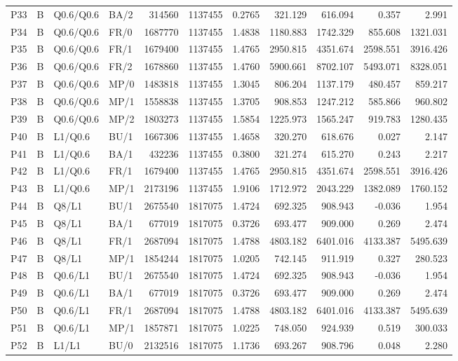 \begin{longtable}{llllrrrrrrr}
P33 & B & Q0.6/Q0.6 & BA/2 & 314560 & 1137455 & 0.2765 & 321.129 & 616.094 & 0.357 & 2.991\\
P34 & B & Q0.6/Q0.6 & FR/0 & 1687770 & 1137455 & 1.4838 & 1180.883 & 1742.329 & 855.608 & 1321.031\\
P35 & B & Q0.6/Q0.6 & FR/1 & 1679400 & 1137455 & 1.4765 & 2950.815 & 4351.674 & 2598.551 & 3916.426\\
P36 & B & Q0.6/Q0.6 & FR/2 & 1678860 & 1137455 & 1.4760 & 5900.661 & 8702.107 & 5493.071 & 8328.051\\
P37 & B & Q0.6/Q0.6 & MP/0 & 1483818 & 1137455 & 1.3045 & 806.204 & 1137.179 & 480.457 & 859.217\\
P38 & B & Q0.6/Q0.6 & MP/1 & 1558838 & 1137455 & 1.3705 & 908.853 & 1247.212 & 585.866 & 960.802\\
P39 & B & Q0.6/Q0.6 & MP/2 & 1803273 & 1137455 & 1.5854 & 1225.973 & 1565.247 & 919.783 & 1280.435\\
P40 & B & L1/Q0.6 & BU/1 & 1667306 & 1137455 & 1.4658 & 320.270 & 618.676 & 0.027 & 2.147\\
P41 & B & L1/Q0.6 & BA/1 & 432236 & 1137455 & 0.3800 & 321.274 & 615.270 & 0.243 & 2.217\\
P42 & B & L1/Q0.6 & FR/1 & 1679400 & 1137455 & 1.4765 & 2950.815 & 4351.674 & 2598.551 & 3916.426\\
P43 & B & L1/Q0.6 & MP/1 & 2173196 & 1137455 & 1.9106 & 1712.972 & 2043.229 & 1382.089 & 1760.152\\
P44 & B & Q8/L1 & BU/1 & 2675540 & 1817075 & 1.4724 & 692.325 & 908.943 & -0.036 & 1.954\\
P45 & B & Q8/L1 & BA/1 & 677019 & 1817075 & 0.3726 & 693.477 & 909.000 & 0.269 & 2.474\\
P46 & B & Q8/L1 & FR/1 & 2687094 & 1817075 & 1.4788 & 4803.182 & 6401.016 & 4133.387 & 5495.639\\
P47 & B & Q8/L1 & MP/1 & 1854244 & 1817075 & 1.0205 & 742.145 & 911.919 & 0.327 & 280.523\\
P48 & B & Q0.6/L1 & BU/1 & 2675540 & 1817075 & 1.4724 & 692.325 & 908.943 & -0.036 & 1.954\\
P49 & B & Q0.6/L1 & BA/1 & 677019 & 1817075 & 0.3726 & 693.477 & 909.000 & 0.269 & 2.474\\
P50 & B & Q0.6/L1 & FR/1 & 2687094 & 1817075 & 1.4788 & 4803.182 & 6401.016 & 4133.387 & 5495.639\\
P51 & B & Q0.6/L1 & MP/1 & 1857871 & 1817075 & 1.0225 & 748.050 & 924.939 & 0.519 & 300.033\\
P52 & B & L1/L1 & BU/0 & 2132516 & 1817075 & 1.1736 & 693.267 & 908.796 & 0.048 & 2.280\\

\end{longtable}
